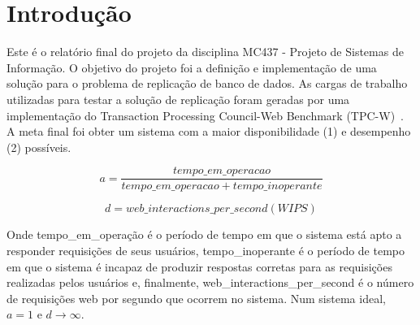 \documentclass[11pt,twoside]{article}
\begin{document}
\begin{abstract}
\setlength{\parindent}{4ex}
Este é o relat\'orio final do projeto da disciplina MC437 (Projeto de Sistemas de Informa\c{c}\~ao), projeto cujo objetivo foi a resolução de um problema de replicação de banco de dados. Foram utilizados dois bancos de dados diferentes, um atuando como primário e outro como secundário. O primário é replicado para um secundário em hot-standby. Ao inserirmos uma falha, promovemos o secundário para primário e fazemos o antigo primário voltar como secundário, sendo que o objetivo foi obter o menor tempo de indisponibilidade possível no sistema.
Utilizamos o benchmark TPC-W, que modela uma livraria online, atrav\'es de um ambiente controlado, para simular atividades num servidor WEB. Em conjunto com o simulador RBE, que gera tr\^es diferentes perfis de carga (Shopping, Ordering e Browsing), pudemos checar o desempenho do servidor instalado num cluster no IC, ao verificarmos o n\'umero de WIPS (WEB Interactions per Second) e WIRT (WEB Interaction Response Time) gerados por diferentes cargas.
\end{abstract}

\section{Introdução}


Este \'e o relat\'orio final do projeto da disciplina MC437 - Projeto de Sistemas de Informação. O objetivo do projeto foi a definição e implementação de uma solução para o problema de replicação de banco de dados. As cargas de trabalho utilizadas para testar a solução de replicação foram geradas por uma implementação do Transaction Processing Council-Web Benchmark (TPC-W)~\cite{TPCW}. A meta final foi obter um sistema com a maior disponibilidade (1) e desempenho (2) possíveis. 

\begin{equation} \label{eq:1}
a = \frac{tempo\_em\_operacao}{tempo\_em\_operacao + tempo\_inoperante}
\end{equation}

\begin{equation} \label{eq:2}
d = web\_interactions\_per\_second(WIPS)
\end{equation}

Onde tempo\_em\_operação é o período de tempo em que o sistema
está apto a responder requisições de seus usuários, tempo\_inoperante é o período de tempo em que o sistema é incapaz de
produzir respostas corretas para as requisições realizadas pelos
usuários e, finalmente, web\_interactions\_per\_second é o número de requisições web por segundo que ocorrem no sistema. Num sistema ideal, $a = 1$ e $d \rightarrow \infty$.
\end{document}
